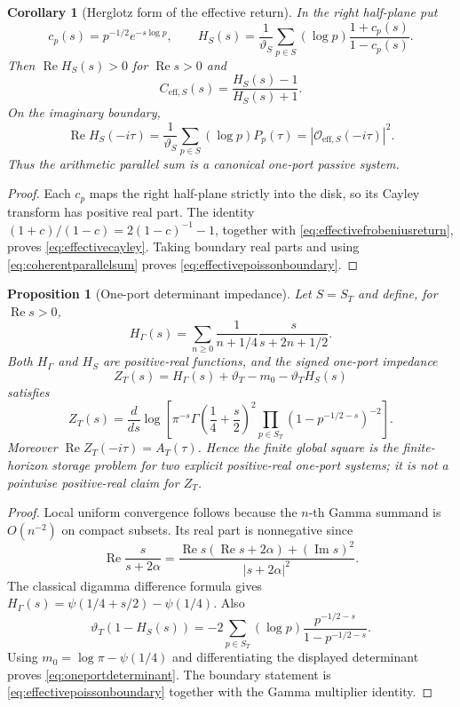 \documentclass[11pt]{amsart}
\newtheorem{proposition}[theorem]{Proposition}
\newtheorem{corollary}[theorem]{Corollary}
\theoremstyle{definition}
\theoremstyle{remark}
\begin{document}
\begin{corollary}[Herglotz form of the effective return]
\label{cor:effectiveherglotz}
In the right half-plane put
\[
 c_p(s)=p^{-1/2}e^{-s\log p},\qquad
 H_S(s)=\frac1{\vartheta_S}\sum_{p\in S}(\log p)
             \frac{1+c_p(s)}{1-c_p(s)}.
\]
Then $\operatorname{Re}H_S(s)>0$ for $\operatorname{Re}s>0$ and
\begin{equation}\label{eq:effectivecayley}
 C_{\mathrm{eff},S}(s)=\frac{H_S(s)-1}{H_S(s)+1}.
\end{equation}
On the imaginary boundary,
\begin{equation}\label{eq:effectivepoissonboundary}
 \operatorname{Re}H_S(-i\tau)
 =\frac1{\vartheta_S}\sum_{p\in S}(\log p)P_p(\tau)
 =|\mathcal O_{\mathrm{eff},S}(-i\tau)|^2.
\end{equation}
Thus the arithmetic parallel sum is a canonical one-port passive system.
\end{corollary}

\begin{proof}
Each $c_p$ maps the right half-plane strictly into the disk, so its Cayley
transform has positive real part.  The identity
\(
 (1+c)/(1-c)=2(1-c)^{-1}-1
\), together with \eqref{eq:effectivefrobeniusreturn}, proves
\eqref{eq:effectivecayley}.  Taking boundary real parts and using
\eqref{eq:coherentparallelsum} proves
\eqref{eq:effectivepoissonboundary}.
\end{proof}

\begin{proposition}[One-port determinant impedance]
\label{prop:oneportdeterminant}
Let $S=S_T$ and define, for $\operatorname{Re}s>0$,
\[
 H_\Gamma(s)=\sum_{n\ge0}\frac1{n+1/4}
                   \frac{s}{s+2n+1/2}.
\]
Both $H_\Gamma$ and $H_S$ are positive-real functions, and the signed
one-port impedance
\[
 Z_T(s)=H_\Gamma(s)+\vartheta_T-m_0-\vartheta_TH_S(s)
\]
satisfies
\begin{equation}\label{eq:oneportdeterminant}
 Z_T(s)=\frac{d}{ds}\log\!\left[
  \pi^{-s}\Gamma\!\left(\frac14+\frac s2\right)^2
  \prod_{p\in S_T}(1-p^{-1/2-s})^{-2}\right].
\end{equation}
Moreover $\operatorname{Re}Z_T(-i\tau)=A_T(\tau)$.  Hence the finite
global square is the finite-horizon storage problem for two explicit
positive-real one-port systems; it is not a pointwise positive-real claim
for $Z_T$.
\end{proposition}

\begin{proof}
Local uniform convergence follows because the $n$-th Gamma summand is
$O(n^{-2})$ on compact subsets.  Its real part is nonnegative since
\[
 \operatorname{Re}\frac{s}{s+2\alpha}
 =\frac{\operatorname{Re}s(\operatorname{Re}s+2\alpha)
         +(\operatorname{Im}s)^2}{|s+2\alpha|^2}.
\]
The classical digamma difference formula gives
\(
 H_\Gamma(s)=\psi(1/4+s/2)-\psi(1/4)
\).
Also
\[
 \vartheta_T(1-H_S(s))
 =-2\sum_{p\in S_T}(\log p)
       \frac{p^{-1/2-s}}{1-p^{-1/2-s}}.
\]
Using $m_0=\log\pi-\psi(1/4)$ and differentiating the displayed determinant
proves \eqref{eq:oneportdeterminant}.  The boundary statement is
\eqref{eq:effectivepoissonboundary} together with the Gamma multiplier
identity.
\end{proof}
\end{document}
